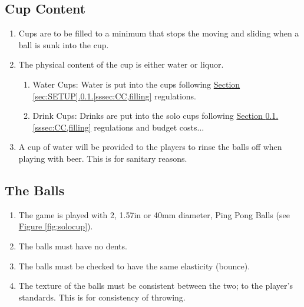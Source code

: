 	\subsection{Cup Content}\label{ssec:CupContent}
        \begin{enumerate}[label=(\roman*), ref=\roman*]
            \item \label{sssec:CC,filling} Cups are to be filled to a minimum that stops the moving and sliding when a ball is sunk into the cup. 
            \item \label{sssec:CC,w_vs_l} The physical content of the cup is either water or liquor.
                \begin{enumerate}[label=(\alph*), leftmargin=2cm]
                    \item Water Cups: Water is put into the cups following \hyperref[sssec:CC,filling]{Section \ref*{sec:SETUP}.\ref*{ssec:CupContent}.\ref*{sssec:CC,filling}} regulations.
                    \item Drink Cups: Drinks are put into the solo cups following \hyperref[sssec:CC,filling]{Section \ref*{ssec:CupContent}.\ref*{sssec:CC,filling}} regulations and budget costs...
                \end{enumerate} 
            \item \label{sssec:CC,rinse} A cup of water will be provided to the players to rinse the balls off when playing with beer. This is for sanitary reasons. 
        \end{enumerate}        
    \subsection{The Balls}\label{ssec:Balls}
        \begin{enumerate}[label=(\roman*), ref=\roman*]
            \item \label{sssec:Balls,num} The game is played with 2, 1.57in or 40mm diameter, Ping Pong Balls (see \hyperref[fig:solocup]{Figure \ref*{fig:solocup}}).
            \item \label{sssec:Balls,dents} The balls must have no dents. 
            \item \label{sssec:Balls,bounce} The balls must be checked to have the same elasticity (bounce). 
            \item \label{sssec:Balls,texture} The texture of the balls must be consistent between the two; to the player's standards. This is for consistency of throwing. 
        \end{enumerate}    
